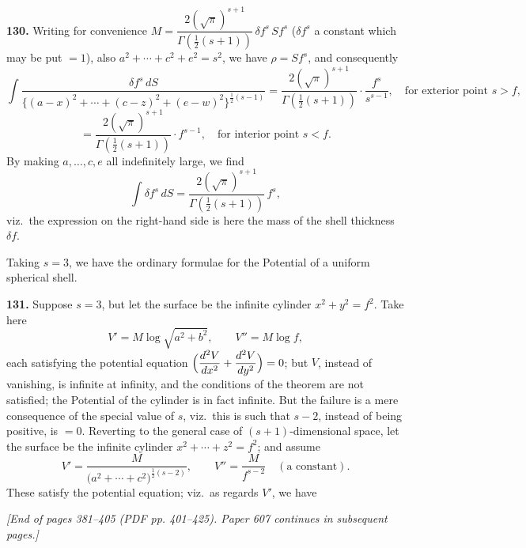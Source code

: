 \documentclass[11pt,a4paper]{article}
\begin{document}
\textbf{130.} Writing for convenience $M = \dfrac{2(\sqrt{\pi})^{s+1}}{\Gamma(\tfrac{1}{2}(s+1))}\,\delta\!f^{s}\,Sf^{s}$ ($\delta\!f^{s}$ a constant which may be put $= 1$), also $a^{2} + \cdots + c^{2} + e^{2} = s^{2}$, we have $\rho = Sf^{s}$, and consequently
\[
\int \frac{\delta\!f^{s}\,dS}{\bigl\{(a-x)^{2} + \cdots + (c-z)^{2} + (e-w)^{2}\bigr\}^{\tfrac{1}{2}(s-1)}}
= \frac{2(\sqrt{\pi})^{s+1}}{\Gamma(\tfrac{1}{2}(s+1))}\cdot\frac{f^{s}}{s^{s-1}},\quad\text{for exterior point }s > f,
\]
\[
= \frac{2(\sqrt{\pi})^{s+1}}{\Gamma(\tfrac{1}{2}(s+1))}\cdot f^{s-1},\quad\text{for interior point }s < f.
\]
By making $a, \ldots, c, e$ all indefinitely large, we find
\[
\int \delta\!f^{s}\,dS = \frac{2(\sqrt{\pi})^{s+1}}{\Gamma(\tfrac{1}{2}(s+1))}\,f^{s},
\]
viz.\ the expression on the right-hand side is here the mass of the shell thickness $\delta\!f$.

Taking $s = 3$, we have the ordinary formulae for the Potential of a uniform spherical shell.

\textbf{131.} Suppose $s = 3$, but let the surface be the infinite cylinder $x^{2} + y^{2} = f^{2}$. Take here
\[
V' = M\log\sqrt{a^{2} + b^{2}},\qquad V'' = M\log f,
\]
each satisfying the potential equation $\Bigl(\dfrac{d^{2}V}{dx^{2}} + \dfrac{d^{2}V}{dy^{2}}\Bigr) = 0$; but $V$, instead of vanishing, is infinite at infinity, and the conditions of the theorem are not satisfied; the Potential of the cylinder is in fact infinite. But the failure is a mere consequence of the special value of $s$, viz.\ this is such that $s - 2$, instead of being positive, is $= 0$. Reverting to the general case of $(s + 1)$-dimensional space, let the surface be the infinite cylinder $x^{2} + \cdots + z^{2} = f^{2}$; and assume
\[
V' = \frac{M}{\bigl(a^{2} + \cdots + c^{2}\bigr)^{\tfrac{1}{2}(s-2)}},\qquad V'' = \frac{M}{f^{s-2}}\quad(\text{a constant}).
\]
These satisfy the potential equation; viz.\ as regards $V'$, we have

\bigskip
\textit{[End of pages 381--405 (PDF pp. 401--425). Paper 607 continues in subsequent pages.]}
\end{document}
